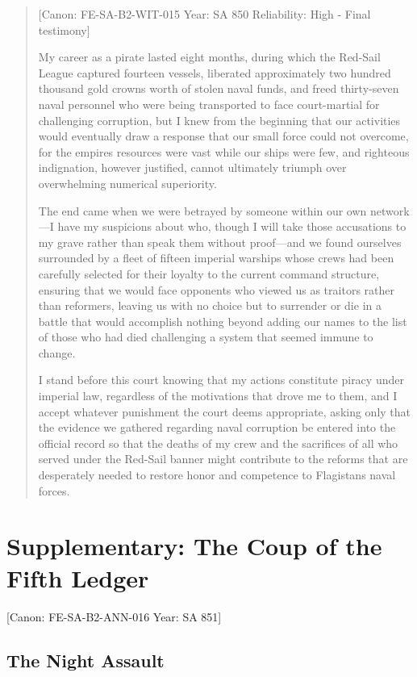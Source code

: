 \begin{quote}
{[}Canon: FE-SA-B2-WIT-015 \textbar{} Year: SA 850 \textbar{}
Reliability: High - Final testimony{]}

My career as a pirate lasted eight months, during which the Red-Sail
League captured fourteen vessels, liberated approximately two hundred
thousand gold crowns worth of stolen naval funds, and freed thirty-seven
naval personnel who were being transported to face court-martial for
challenging corruption, but I knew from the beginning that our
activities would eventually draw a response that our small force could
not overcome, for the empire\textquotesingle s resources were vast while
our ships were few, and righteous indignation, however justified, cannot
ultimately triumph over overwhelming numerical superiority.

The end came when we were betrayed by someone within our own network---I
have my suspicions about who, though I will take those accusations to my
grave rather than speak them without proof---and we found ourselves
surrounded by a fleet of fifteen imperial warships whose crews had been
carefully selected for their loyalty to the current command structure,
ensuring that we would face opponents who viewed us as traitors rather
than reformers, leaving us with no choice but to surrender or die in a
battle that would accomplish nothing beyond adding our names to the list
of those who had died challenging a system that seemed immune to change.

I stand before this court knowing that my actions constitute piracy
under imperial law, regardless of the motivations that drove me to them,
and I accept whatever punishment the court deems appropriate, asking
only that the evidence we gathered regarding naval corruption be entered
into the official record so that the deaths of my crew and the
sacrifices of all who served under the Red-Sail banner might contribute
to the reforms that are desperately needed to restore honor and
competence to Flagistan\textquotesingle s naval forces.
\end{quote}

\section{Supplementary: The Coup of the Fifth
Ledger}\label{supplementary-the-coup-of-the-fifth-ledger}

{[}Canon: FE-SA-B2-ANN-016 \textbar{} Year: SA 851{]}

\subsection{The Night Assault}\label{the-night-assault}

